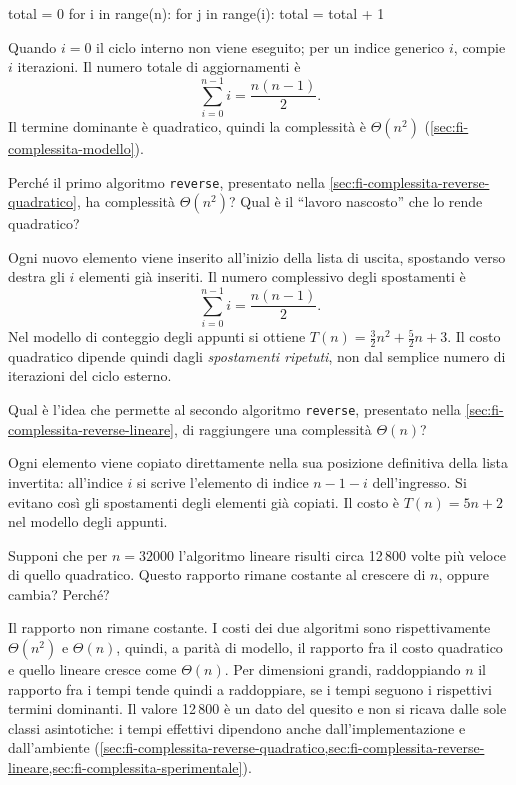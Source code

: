 \begin{unipdcode}[language=Python]
total = 0
for i in range(n):
    for j in range(i):
        total = total + 1
\end{unipdcode}

Quando \(i=0\) il ciclo interno non viene eseguito; per un
indice generico \(i\), compie \(i\) iterazioni. Il numero
totale di aggiornamenti è
\[
  \sum_{i=0}^{n-1}i=\frac{n(n-1)}2.
\]
Il termine dominante è quadratico, quindi la complessità
è \(\Theta(n^2)\) (\cref{sec:fi-complessita-modello}).

\begin{exercise}
\label{ex:fi-esercizi-complessita-reverse-quadratico}
Perché il primo algoritmo \texttt{reverse}, presentato nella
\cref{sec:fi-complessita-reverse-quadratico}, ha complessità
\(\Theta(n^2)\)? Qual è il ``lavoro nascosto'' che lo rende
quadratico?
\end{exercise}

Ogni nuovo elemento viene inserito all'inizio della lista di
uscita, spostando verso destra gli \(i\) elementi già inseriti.
Il numero complessivo degli spostamenti è
\[
  \sum_{i=0}^{n-1}i=\frac{n(n-1)}2.
\]
Nel modello di conteggio degli appunti si ottiene
\(T(n)=\frac32n^2+\frac52n+3\). Il costo quadratico dipende
quindi dagli \emph{spostamenti ripetuti}, non dal semplice
numero di iterazioni del ciclo esterno.

\begin{exercise}
\label{ex:fi-esercizi-complessita-reverse-lineare}
Qual è l'idea che permette al secondo algoritmo
\texttt{reverse}, presentato nella
\cref{sec:fi-complessita-reverse-lineare}, di raggiungere
una complessità \(\Theta(n)\)?
\end{exercise}

Ogni elemento viene copiato direttamente nella sua
posizione definitiva della lista invertita: all'indice \(i\)
si scrive l'elemento di indice \(n-1-i\) dell'ingresso.
Si evitano così gli spostamenti degli elementi già copiati.
Il costo è \(T(n)=5n+2\) nel modello degli appunti.

\begin{exercise}
\label{ex:fi-esercizi-complessita-rapporto-reverse}
Supponi che per \(n=32000\) l'algoritmo lineare risulti circa
12\,800 volte più veloce di quello quadratico. Questo rapporto rimane costante
al crescere di \(n\), oppure cambia? Perché?
\end{exercise}

Il rapporto non rimane costante. I costi dei due algoritmi
sono rispettivamente \(\Theta(n^2)\) e \(\Theta(n)\), quindi,
a parità di modello, il rapporto fra il costo quadratico e
quello lineare cresce come \(\Theta(n)\). Per dimensioni grandi,
raddoppiando \(n\) il rapporto fra i tempi tende quindi
a raddoppiare, se i tempi seguono i rispettivi termini dominanti.
Il valore 12\,800 è un dato del quesito e non si ricava
dalle sole classi asintotiche: i tempi effettivi dipendono
anche dall'implementazione e dall'ambiente
(\cref{sec:fi-complessita-reverse-quadratico,sec:fi-complessita-reverse-lineare,sec:fi-complessita-sperimentale}).

